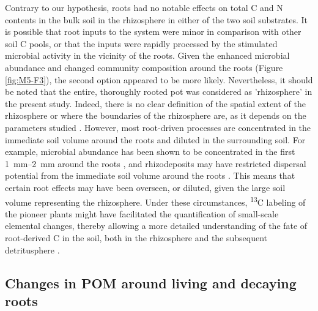 Contrary to our hypothesis, roots had no notable effects on total C and N contents in the bulk soil in the rhizosphere in either of the two soil substrates. It is possible that root inputs to the system were minor in comparison with other soil C pools, or that the inputs were rapidly processed by the stimulated microbial activity in the vicinity of the roots. Given the enhanced microbial abundance and changed community composition around the roots (Figure \ref{fig:M5-F3}), the second option appeared to be more likely. Nevertheless, it should be noted that the entire, thoroughly rooted pot was considered as 'rhizosphere' in the present study. Indeed, there is no clear definition of the spatial extent of the rhizosphere or where the boundaries of the rhizosphere are, as it depends on the parameters studied \citep{Kuzyakov2019}. However, most root-driven processes are concentrated in the immediate soil volume around the roots and diluted in the surrounding soil. For example, microbial abundance has been shown to be concentrated in the first \SIrange{1}{2}{\milli\metre} around the roots \citep{Marschner2012}, and rhizodeposits may have restricted dispersal potential from the immediate soil volume around the roots \citep{Kuzyakov2019}. This means that certain root effects may have been overseen, or diluted, given the large soil volume representing the rhizosphere. Under these circumstances, \textsuperscript{13}C labeling of the pioneer plants might have facilitated the quantification of small-scale elemental changes, thereby allowing a more detailed understanding of the fate of root-derived C in the soil, both in the rhizosphere and the subsequent detritusphere \citep{Teixeira2024}.

\subsection{Changes in POM around living and decaying roots}

